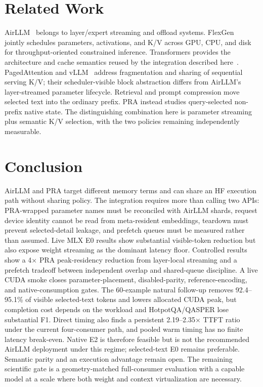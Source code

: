 \documentclass[10pt]{article}
\begin{document}
\section{Related Work}

AirLLM~\cite{airllm} belongs to layer/expert streaming and offload systems.
FlexGen~\cite{flexgen} jointly schedules parameters, activations, and K/V across
GPU, CPU, and disk for throughput-oriented constrained inference. Transformers
provides the architecture and cache semantics reused by the integration
described here~\cite{transformers}. PagedAttention and vLLM~\cite{vllm} address
fragmentation and sharing of sequential serving K/V; their scheduler-visible
block abstraction differs from AirLLM's layer-streamed parameter lifecycle.
Retrieval and prompt compression move selected text into the ordinary prefix.
PRA instead studies query-selected non-prefix native state. The distinguishing
combination here is parameter streaming plus semantic K/V selection, with the
two policies remaining independently measurable.

\section{Conclusion}

AirLLM and PRA target different memory terms and can share an HF execution path
without sharing policy. The integration requires more than calling two APIs:
PRA-wrapped parameter names must be reconciled with AirLLM shards, request
device identity cannot be read from meta-resident embeddings, teardown must
prevent selected-detail leakage, and prefetch queues must be measured rather
than assumed. Live MLX E0 results show substantial visible-token reduction but
also expose weight streaming as the dominant latency floor. Controlled results
show a 4$\times$ PRA peak-residency reduction from layer-local streaming and a
prefetch tradeoff between independent overlap and shared-queue discipline. A
live CUDA smoke closes parameter-placement, disabled-parity, reference-encoding,
and native-consumption gates. The 60-example natural follow-up removes
92.4--95.1\% of visible selected-text tokens and lowers allocated CUDA peak,
but completion cost depends on the workload and HotpotQA/QASPER lose substantial
F1. Direct timing also finds a persistent 2.19--2.35$\times$ TTFT ratio under
the current four-consumer path, and pooled warm timing has no finite latency
break-even. Native E2 is therefore feasible but is not the recommended AirLLM
deployment under this regime; selected-text E0 remains preferable. Semantic
parity and an execution advantage remain open. The remaining scientific gate is a
geometry-matched full-consumer evaluation with a capable model at a scale where
both weight and context virtualization are necessary.
\end{document}
